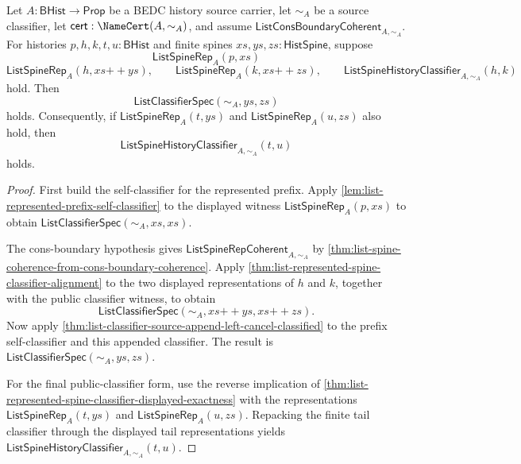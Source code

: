 \begin{theorem}
\label{thm:list-public-prefix-append-left-cancel}
Let $A:\mathsf{BHist}\to\mathsf{Prop}$ be a BEDC history source carrier, let
$\sim_A$ be a source classifier, let $\mathsf{cert}:\NameCert(A,\sim_A)$, and
assume $\mathsf{ListConsBoundaryCoherent}_{A,\sim_A}$. For histories
$p,h,k,t,u:\mathsf{BHist}$ and finite spines $xs,ys,zs:\mathsf{HistSpine}$,
suppose
$$
\mathsf{ListSpineRep}_A(p,xs)
$$
$$
\mathsf{ListSpineRep}_A(h,xs{++}ys),
\qquad
\mathsf{ListSpineRep}_A(k,xs{++}zs),
\qquad
\mathsf{ListSpineHistoryClassifier}_{A,\sim_A}(h,k)
$$
hold. Then
$$
\mathsf{ListClassifierSpec}(\sim_A,ys,zs)
$$
holds. Consequently, if $\mathsf{ListSpineRep}_A(t,ys)$ and
$\mathsf{ListSpineRep}_A(u,zs)$ also hold, then
$$
\mathsf{ListSpineHistoryClassifier}_{A,\sim_A}(t,u)
$$
holds.
\end{theorem}
\begin{proof}
First build the self-classifier for the represented prefix. Apply
\autoref{lem:list-represented-prefix-self-classifier} to the displayed witness
$\mathsf{ListSpineRep}_A(p,xs)$ to obtain
$\mathsf{ListClassifierSpec}(\sim_A,xs,xs)$.

The cons-boundary hypothesis gives
$\mathsf{ListSpineRepCoherent}_{A,\sim_A}$ by
\autoref{thm:list-spine-coherence-from-cons-boundary-coherence}. Apply
\autoref{thm:list-represented-spine-classifier-alignment} to the two displayed
representations of $h$ and $k$, together with the public classifier witness, to
obtain
$$
\mathsf{ListClassifierSpec}(\sim_A,xs{++}ys,xs{++}zs).
$$
Now apply \autoref{thm:list-classifier-source-append-left-cancel-classified} to
the prefix self-classifier and this appended classifier. The result is
$\mathsf{ListClassifierSpec}(\sim_A,ys,zs)$.

For the final public-classifier form, use the reverse implication of
\autoref{thm:list-represented-spine-classifier-displayed-exactness} with the
representations $\mathsf{ListSpineRep}_A(t,ys)$ and
$\mathsf{ListSpineRep}_A(u,zs)$. Repacking the finite tail classifier through
the displayed tail representations yields
$\mathsf{ListSpineHistoryClassifier}_{A,\sim_A}(t,u)$.
\end{proof}
